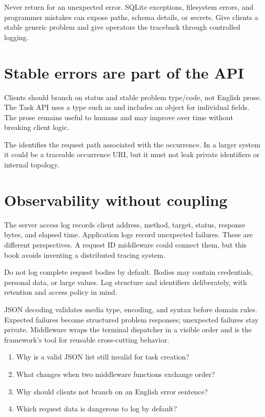 \begin{securityboundary}
Never return  for an unexpected error. SQLite exceptions,
filesystem errors, and programmer mistakes can expose paths, schema details, or
secrets. Give clients a stable generic problem and give operators the traceback
through controlled logging.
\end{securityboundary}

\section{Stable errors are part of the API}

Clients should branch on status and stable problem type/code, not English prose.
The Task API uses a type such as
 and includes an  object
for individual fields. The prose remains useful to humans and may improve over
time without breaking client logic.

The  identifies the request path associated with the occurrence.
In a larger system it could be a traceable occurrence URI, but it must not leak
private identifiers or internal topology.

\section{Observability without coupling}

The server access log records client address, method, target, status, response
bytes, and elapsed time. Application logs record unexpected failures. These are
different perspectives. A request ID middleware could connect them, but this
book avoids inventing a distributed tracing system.

Do not log complete request bodies by default. Bodies may contain credentials,
personal data, or large values. Log structure and identifiers deliberately,
with retention and access policy in mind.

\summarytitle

JSON decoding validates media type, encoding, and syntax before domain rules.
Expected failures become structured problem responses; unexpected failures stay
private. Middleware wraps the terminal dispatcher in a visible order and is the
framework's tool for reusable cross-cutting behavior.

\reviewtitle
\begin{enumerate}
  \item Why is a valid JSON list still invalid for task creation?
  \item What changes when two middleware functions exchange order?
  \item Why should clients not branch on an English error sentence?
  \item Which request data is dangerous to log by default?
\end{enumerate}

